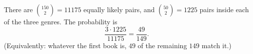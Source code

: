 There are $\binom{150}{2}=11175$ equally likely pairs, and $\binom{50}{2}=1225$ pairs inside each of the three genres. The probability is
\[
\dfrac{3\cdot1225}{11175}=\boxed{\dfrac{49}{149}} .
\]
(Equivalently: whatever the first book is, $49$ of the remaining $149$ match it.)
